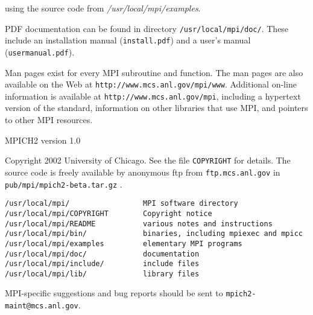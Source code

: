 using the source code from {\em /usr/local/mpi/examples}.
\par
{}
\par
PDF documentation can be found in directory
{\tt /usr/local/mpi/doc/}.  These include an installation manual ({\tt install.pdf})
and a user's manual ({\tt usermanual.pdf}).
\par
Man pages exist for every MPI subroutine and function.  The man pages are
also available on the Web at {\tt http://www.mcs.anl.gov/mpi/www}.
Additional on-line information is available at {\tt http://www.mcs.anl.gov/mpi},
including a hypertext version of the standard, information on other libraries
that use MPI, and pointers to other MPI resources.
\par
{}
\par
MPICH2 version 1.0
\par
{}
\par
Copyright 2002 University of Chicago.
See the file {\tt COPYRIGHT} for details.  The source code is freely available
by anonymous ftp from {\tt ftp.mcs.anl.gov} in {\tt pub/mpi/mpich2-beta.tar.gz} .
\par
{}
\par
\begin{verbatim}
/usr/local/mpi/                 MPI software directory
/usr/local/mpi/COPYRIGHT        Copyright notice
/usr/local/mpi/README           various notes and instructions
/usr/local/mpi/bin/             binaries, including mpiexec and mpicc
/usr/local/mpi/examples         elementary MPI programs
/usr/local/mpi/doc/             documentation
/usr/local/mpi/include/         include files
/usr/local/mpi/lib/             library files
\end{verbatim}

\par
{}
\par
MPI-specific suggestions and bug reports should
be sent to {\tt mpich2-maint@mcs.anl.gov}.
\par
{}
\endmanpage
